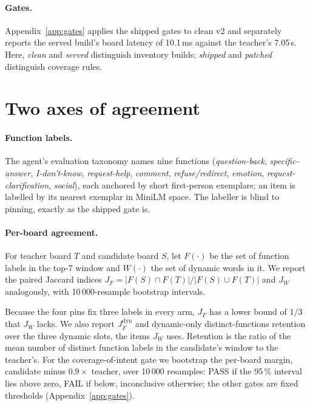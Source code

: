 \paragraph{Gates.}
Appendix~\ref{app:gates} applies the shipped gates to clean v2 and
separately reports the served build's board latency of 10.1\,ms against
the teacher's 7.05\,s. Here, \emph{clean} and \emph{served} distinguish
inventory builds; \emph{shipped} and \emph{patched} distinguish coverage
rules.

\section{Two axes of agreement}
\label{sec:method}

\paragraph{Function labels.}
The agent's evaluation taxonomy names nine functions
(\emph{question-back}, \emph{specific-answer}, \emph{I-don't-know},
\emph{request-help}, \emph{comment}, \emph{refuse/redirect},
\emph{emotion}, \emph{request-clarification}, \emph{social}), each anchored
by short first-person exemplars; an item is labelled by its nearest
exemplar in MiniLM space. The labeller is blind to pinning, exactly as the
shipped gate is.

\paragraph{Per-board agreement.}
For teacher board $T$ and candidate board $S$, let $F(\cdot)$ be the set
of function labels in the top-7 window and $W(\cdot)$ the set of dynamic
words in it. We report the paired Jaccard indices
$J_F=|F(S)\cap F(T)|/|F(S)\cup F(T)|$ and $J_W$ analogously, with
10\,000-resample bootstrap intervals.

Because the four pins fix three labels in every arm, $J_F$ has a lower
bound of $1/3$ that $J_W$ lacks. We also report $J_F^{\mathrm{dyn}}$ and
dynamic-only distinct-functions retention over the three dynamic slots,
the items $J_W$ uses. Retention is the ratio of the mean number of
distinct function labels in the candidate's window to the teacher's. For the
coverage-of-intent gate we bootstrap the per-board margin, candidate minus
$0.9\times$ teacher, over 10\,000 resamples: PASS if the 95\,\% interval
lies above zero, FAIL if below, inconclusive otherwise; the other gates are
fixed thresholds (Appendix~\ref{app:gates}).

